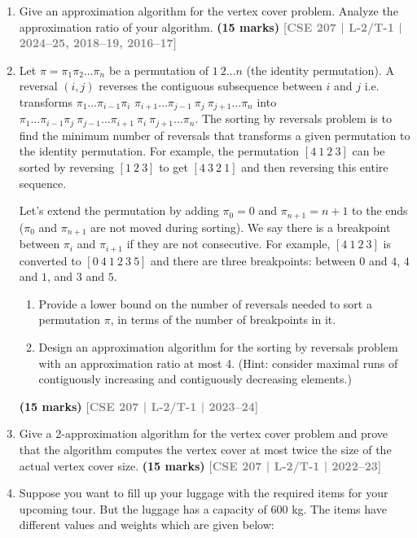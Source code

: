 \documentclass[12pt]{article}
\newcommand{\yr}[1]{\hfill\textcolor{gray}{\small\textbf{[#1]}}}
\newcommand{\mk}[1]{\textcolor{orange!70!black}{\small\textbf{(#1 marks)}}}
\begin{document}
\begin{enumerate}

\item Give an approximation algorithm for the vertex cover problem. Analyze the approximation ratio of your algorithm.
\mk{15} \yr{CSE 207 | L-2/T-1 | 2024--25, 2018--19, 2016--17}


\item Let $\pi = \pi_1 \pi_2 \dots \pi_n$ be a permutation of $1\ 2 \dots n$ (the identity permutation). A reversal
$(i, j)$ reverses the contiguous subsequence between $i$ and $j$ i.e. transforms $\pi_1 \dots \pi_{i-1}\pi_i$
$\pi_{i+1} \dots \pi_{j-1}\ \pi_j\ \pi_{j+1} \dots \pi_{n}$ into $\pi_1 \dots \pi_{i-1}\pi_j\ \pi_{j-1} \dots \pi_{i+1}\ \pi_i\ \pi_{j+1} \dots \pi_n$. The sorting by
reversals problem is to find the minimum number of reversals that transforms a given
permutation to the identity permutation. For example, the permutation $[4\ 1\ 2\ 3]$ can be
sorted by reversing $[1\ 2\ 3]$ to get $[4\ 3\ 2\ 1]$ and then reversing this entire sequence.

Let's extend the permutation by adding $\pi_0 = 0$ and $\pi_{n+1} = n + 1$ to the ends ($\pi_0$ and $\pi_{n+1}$
are not moved during sorting). We say there is a breakpoint between $\pi_i$ and $\pi_{i+1}$ if they
are not consecutive. For example, $[4\ 1\ 2\ 3]$ is converted to $[0\ 4\ 1\ 2\ 3\ 5]$ and there are
three breakpoints: between $0$ and $4$, $4$ and $1$, and $3$ and $5$.
\begin{enumerate}
\item Provide a lower bound on the number of reversals needed to sort a permutation $\pi$, in terms of the number of breakpoints in it.
\item Design an approximation algorithm for the sorting by reversals problem with an approximation ratio at most 4. (Hint: consider maximal runs of contiguously increasing and contiguously decreasing elements.)
\end{enumerate}
\mk{15} \yr{CSE 207 | L-2/T-1 | 2023--24}


\item Give a 2-approximation algorithm for the vertex cover problem and prove that the algorithm computes the vertex cover at most twice the size of the actual vertex cover size.
\mk{15} \yr{CSE 207 | L-2/T-1 | 2022--23}


\item Suppose you want to fill up your luggage with the required items for your upcoming
tour. But the luggage has a capacity of 600 kg. The items have different values and
weights which are given below:


\end{enumerate}
\end{document}

